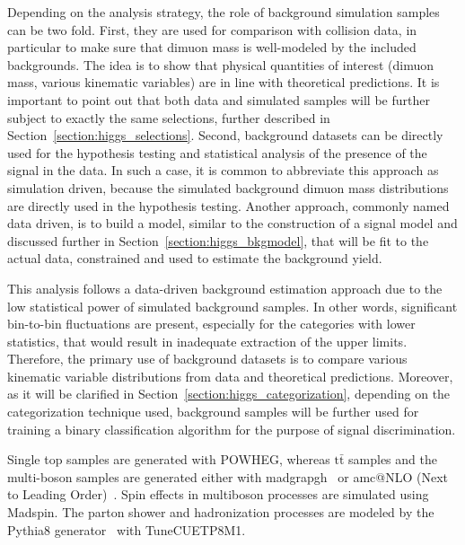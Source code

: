 Depending on the analysis strategy, the role of background simulation samples can be two fold. First, they are used for comparison with collision data, in particular to make sure that dimuon mass is well-modeled by the included backgrounds. The idea is to show that physical quantities of interest (dimuon mass, various kinematic variables) are in line with theoretical predictions. It is important to point out that both data and simulated samples will be further subject to exactly the same selections, further described in Section~\ref{section:higgs_selections}. Second, background datasets can be directly used for the hypothesis testing and statistical analysis of the presence of the signal in the data. In such a case, it is common to abbreviate this approach as simulation driven, because the simulated background dimuon mass distributions are directly used in the hypothesis testing. Another approach, commonly named data driven, is to build a model, similar to the construction of a signal model and discussed further in Section~\ref{section:higgs_bkgmodel}, that will be fit to the actual data, constrained and used to estimate the background yield.

This analysis follows a data-driven background estimation approach due to the low statistical power of simulated background samples. In other words, significant bin-to-bin fluctuations are present, especially for the categories with lower statistics, that would result in inadequate extraction of the upper limits. Therefore, the primary use of background datasets is to compare various kinematic variable distributions from data and theoretical predictions. Moreover, as it will be clarified in Section~\ref{section:higgs_categorization}, depending on the categorization technique used, background samples will be further used for training a binary classification algorithm for the purpose of signal discrimination.

Single top samples are generated with {\sc POWHEG}, whereas $\mathrm{t\bar{t}}$ samples and the multi-boson samples are generated either with {\sc madgrapgh}~\cite{Alwall:2011uj} or {\sc amc@NLO} (Next to Leading Order)~\cite{amcatnlo}. Spin effects in multiboson processes are simulated using {\sc Madspin}. The parton shower and hadronization processes are modeled by the {\sc Pythia8} generator~\cite{Sjostrand:2007gs} with TuneCUETP8M1.



